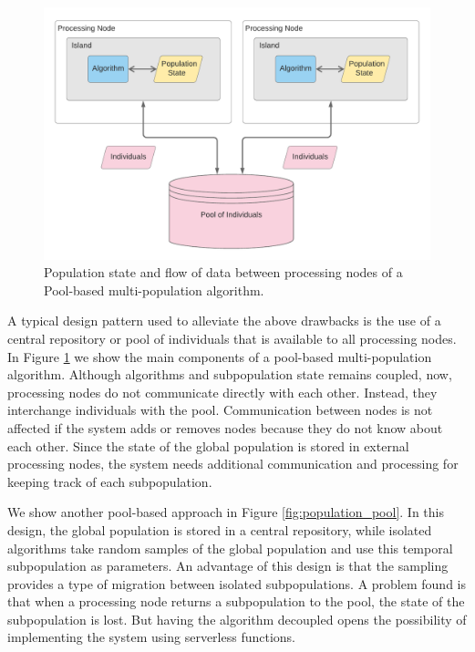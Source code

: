 \documentclass[review]{elsarticle}
\begin{document}
\begin{figure}[ht]
    \centering
    \includegraphics[width=\textwidth]{pool_island}
    \caption{Population state and flow of data between processing nodes of a Pool-based multi-population algorithm.}
    \label{fig:pool_island}
\end{figure}

A typical design pattern used to alleviate the above drawbacks is the use of a
central repository or pool of individuals that is available to all processing
nodes.  In Figure \ref{fig:pool_island} we show the main components of a pool-based
multi-population algorithm. Although algorithms and subpopulation state remains
coupled, now, processing nodes do not communicate directly with each other.
Instead, they interchange individuals with the pool. Communication between nodes
is not affected if the system adds or removes nodes because they do not know
about each other.  Since the state of the global population is stored in
external processing nodes, the system needs additional communication and
processing for keeping track of each subpopulation.

We show another pool-based approach in Figure  \ref{fig:population_pool}. In
this design, the global population is stored in a central repository, while
isolated algorithms take random samples of the global population and use this
temporal subpopulation as parameters. An advantage of this design is that the
sampling provides a type of migration between isolated subpopulations. A problem
found is that when a processing node returns a subpopulation to the pool, the
state of the subpopulation is lost. But having the algorithm decoupled opens the
possibility of implementing the system using serverless functions.
\end{document}
